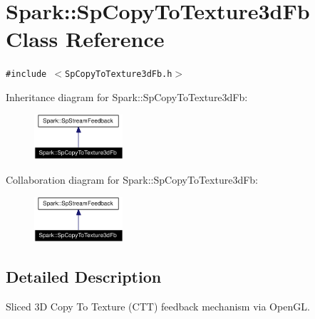 \section{Spark::Sp\-Copy\-To\-Texture3d\-Fb Class Reference}
\label{classSpark_1_1SpCopyToTexture3dFb}
{\tt \#include $<$Sp\-Copy\-To\-Texture3d\-Fb.h$>$}

Inheritance diagram for Spark::Sp\-Copy\-To\-Texture3d\-Fb:\begin{figure}[H]
\begin{center}
\leavevmode
\includegraphics[width=93pt]{classSpark_1_1SpCopyToTexture3dFb__inherit__graph}
\end{center}
\end{figure}
Collaboration diagram for Spark::Sp\-Copy\-To\-Texture3d\-Fb:\begin{figure}[H]
\begin{center}
\leavevmode
\includegraphics[width=93pt]{classSpark_1_1SpCopyToTexture3dFb__coll__graph}
\end{center}
\end{figure}


\subsection{Detailed Description}
Sliced 3D Copy To Texture (CTT) feedback mechanism via Open\-GL. 

